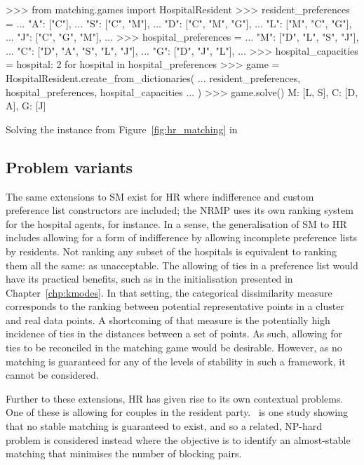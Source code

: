 \begin{listing}[htbp]
\begin{usagepy}
>>> from matching.games import HospitalResident
>>> resident_preferences = {
...     "A": ["C"],
...     "S": ["C", "M"],
...     "D": ["C", "M", "G"],
...     "L": ["M", "C", "G"],
...     "J": ["C", "G", "M"],
... }
>>> hospital_preferences = {
...     "M": ["D", "L", "S", "J"],
...     "C": ["D", "A", "S", "L", "J"],
...     "G": ["D", "J", "L"],
... }
>>> hospital_capacities = {hospital: 2 for hospital in hospital_preferences}
>>> game = HospitalResident.create_from_dictionaries(
...     resident_preferences, hospital_preferences, hospital_capacities
... )
>>> game.solve()
{M: [L, S], C: [D, A], G: [J]}

\end{usagepy}
\caption{Solving the instance from Figure~\ref{fig:hr_matching} in \matching}
\label{snp:hospital_resident}
\end{listing}

\subsection{Problem variants}

The same extensions to SM exist for HR where indifference and custom preference
list constructors are included; the NRMP uses its own ranking system for the
hospital agents, for instance. In a sense, the generalisation of SM to HR
includes allowing for a form of indifference by allowing incomplete preference
lists by residents. Not ranking any subset of the hospitals is equivalent to
ranking them all the same: as unacceptable. The allowing of ties in a preference
list would have its practical benefits, such as in the initialisation presented
in Chapter~\ref{chp:kmodes}. In that setting, the categorical dissimilarity
measure corresponds to the ranking between potential representative points in a
cluster and real data points. A shortcoming of that measure is the potentially
high incidence of ties in the distances between a set of points. As such,
allowing for ties to be reconciled in the matching game would be desirable.
However, as no matching is guaranteed for any of the levels of stability in such
a framework, it cannot be considered.

Further to these extensions, HR has given rise to its own contextual problems.
One of these is allowing for couples in the resident party.~\cite{Manlove2016}
is one study showing that no stable matching is guaranteed to exist, and so a
related, NP-hard problem is considered instead where the objective is to
identify an almost-stable matching that minimises the number of blocking pairs.

